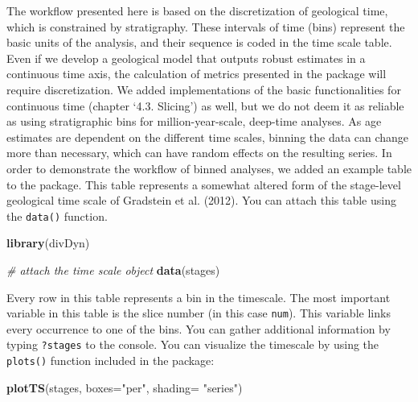 \documentclass[]{article}
\newenvironment{Shaded}{\begin{snugshade}}{\end{snugshade}}
\newcommand{\CommentTok}[1]{\textcolor[rgb]{0.56,0.35,0.01}{\textit{#1}}}
\newcommand{\DataTypeTok}[1]{\textcolor[rgb]{0.13,0.29,0.53}{#1}}
\newcommand{\KeywordTok}[1]{\textcolor[rgb]{0.13,0.29,0.53}{\textbf{#1}}}
\newcommand{\NormalTok}[1]{#1}
\newcommand{\StringTok}[1]{\textcolor[rgb]{0.31,0.60,0.02}{#1}}
\begin{document}
The workflow presented here is based on the discretization of geological
time, which is constrained by stratigraphy. These intervals of time
(bins) represent the basic units of the analysis, and their sequence is
coded in the time scale table. Even if we develop a geological model
that outputs robust estimates in a continuous time axis, the calculation
of metrics presented in the package will require discretization. We
added implementations of the basic functionalities for continuous time
(chapter `4.3. Slicing') as well, but we do not deem it as reliable as
using stratigraphic bins for million-year-scale, deep-time analyses. As
age estimates are dependent on the different time scales, binning the
data can change more than necessary, which can have random effects on
the resulting series. In order to demonstrate the workflow of binned
analyses, we added an example table to the package. This table
represents a somewhat altered form of the stage-level geological time
scale of Gradstein et al. (2012). You can attach this table using the
\texttt{data()} function.

\begin{Shaded}
\begin{Highlighting}[]
\KeywordTok{library}\NormalTok{(divDyn)}
\end{Highlighting}
\end{Shaded}

\begin{Shaded}
\begin{Highlighting}[]
\CommentTok{# attach the time scale object}
\KeywordTok{data}\NormalTok{(stages)}
\end{Highlighting}
\end{Shaded}

Every row in this table represents a bin in the timescale. The most
important variable in this table is the slice number (in this case
\texttt{num}). This variable links every occurrence to one of the bins.
You can gather additional information by typing \texttt{?stages} to the
console. You can visualize the timescale by using the \texttt{plots()}
function included in the package:

\begin{Shaded}
\begin{Highlighting}[]
\KeywordTok{plotTS}\NormalTok{(stages, }\DataTypeTok{boxes=}\StringTok{"per"}\NormalTok{, }\DataTypeTok{shading=} \StringTok{"series"}\NormalTok{)}
\end{Highlighting}
\end{Shaded}
\end{document}
